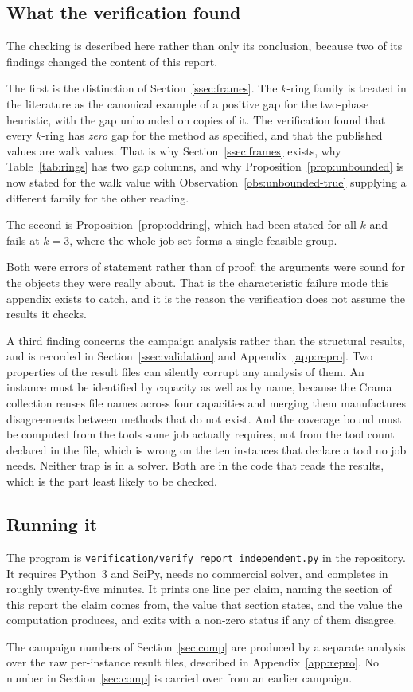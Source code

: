 \subsection{What the verification found}\label{ssec:verify-found}

The checking is described here rather than only its conclusion, because two of its
findings changed the content of this report.

The first is the distinction of Section~\ref{ssec:frames}. The $k$-ring family is
treated in the literature as the canonical example of a positive gap for the two-phase
heuristic, with the gap unbounded on copies of it. The verification found that every
$k$-ring has \emph{zero} gap for the method as specified, and that the published values
are walk values. That is why
Section~\ref{ssec:frames} exists, why Table~\ref{tab:rings} has two gap columns, and
why Proposition~\ref{prop:unbounded} is now stated for the walk value with
Observation~\ref{obs:unbounded-true} supplying a different family for the other
reading.

The second is Proposition~\ref{prop:oddring}, which had been stated for all $k$ and
fails at $k=3$, where the whole job set forms a single feasible group.

Both were errors of statement rather than of proof: the arguments were sound for the
objects they were really about. That is the characteristic failure mode this appendix
exists to catch, and it is the reason the verification does not assume the results it
checks.

A third finding concerns the campaign analysis rather than the structural results, and
is recorded in Section~\ref{ssec:validation} and Appendix~\ref{app:repro}. Two
properties of the result files can silently corrupt any analysis of them. An instance
must be identified by capacity as well as by name, because the Crama collection reuses
file names across four capacities and merging them manufactures disagreements between
methods that do not exist. And the coverage bound must be computed from the tools some
job actually requires, not from the tool count declared in the file, which is wrong on
the ten instances that declare a tool no job needs. Neither trap is in a solver. Both
are in the code that reads the results, which is the part least likely to be checked.

\subsection{Running it}\label{ssec:verify-running}

The program is \texttt{verification/verify\_report\_independent.py} in the repository.
It requires Python~3 and SciPy, needs no commercial solver, and completes in roughly
twenty-five minutes. It prints one line per claim, naming the section of this report the
claim comes from, the value that section states, and the value the computation
produces, and exits with a non-zero status if any of them disagree.

The campaign numbers of Section~\ref{sec:comp} are produced by a separate analysis over
the raw per-instance result files, described in Appendix~\ref{app:repro}. No number in
Section~\ref{sec:comp} is carried over from an earlier campaign.
